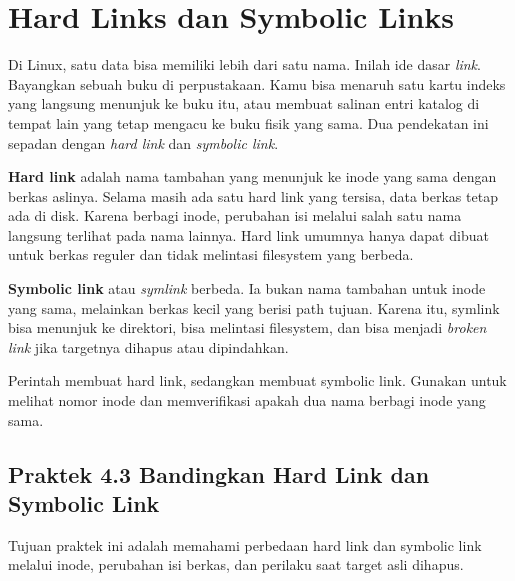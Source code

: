 \section{Hard Links dan Symbolic Links}
\label{sec:links}

Di Linux, satu data bisa memiliki lebih dari satu nama. Inilah ide dasar \textit{link}.
Bayangkan sebuah buku di perpustakaan. Kamu bisa menaruh satu kartu indeks yang langsung
menunjuk ke buku itu, atau membuat salinan entri katalog di tempat lain yang tetap
mengacu ke buku fisik yang sama. Dua pendekatan ini sepadan dengan \textit{hard link}
dan \textit{symbolic link}.

\textbf{Hard link} adalah nama tambahan yang menunjuk ke inode yang sama dengan berkas
aslinya. Selama masih ada satu hard link yang tersisa, data berkas tetap ada di disk.
Karena berbagi inode, perubahan isi melalui salah satu nama langsung terlihat pada nama
lainnya. Hard link umumnya hanya dapat dibuat untuk berkas reguler dan tidak melintasi
filesystem yang berbeda.

\textbf{Symbolic link} atau \textit{symlink} berbeda. Ia bukan nama tambahan untuk inode
yang sama, melainkan berkas kecil yang berisi path tujuan. Karena itu, symlink bisa
menunjuk ke direktori, bisa melintasi filesystem, dan bisa menjadi \textit{broken link}
jika targetnya dihapus atau dipindahkan.

Perintah  membuat hard link, sedangkan 
membuat symbolic link. Gunakan  untuk melihat nomor inode dan memverifikasi
apakah dua nama berbagi inode yang sama.

\subsection*{Praktek 4.3 Bandingkan Hard Link dan Symbolic Link}

Tujuan praktek ini adalah memahami perbedaan hard link dan symbolic link melalui inode,
perubahan isi berkas, dan perilaku saat target asli dihapus.

